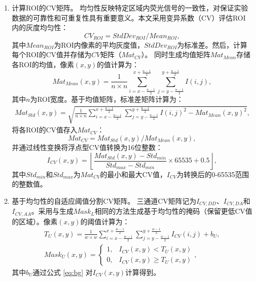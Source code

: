 \begin{enumerate}
\item {计算ROI的CV矩阵。}  
均匀性反映特定区域内荧光信号的一致性，对保证实验数据的可靠性和可重复性具有重要意义。本文采用变异系数（CV）评估ROI内的灰度均匀性：
\begin{equation}
   {CV}_{ROI}={StdDev}_{ROI} / {Mean}_{ROI},
    \label{eq4}
\end{equation}
其中${Mean}_{ROI}$为ROI内像素的平均灰度值，${StdDev}_{ROI}$为标准差。然后，计算每个ROI的CV值并存储为$CV$矩阵（${Mat}_{CV}$）。  
同时生成均值矩阵${Mat}_{Mean}$存储各ROI的均值，像素$(x,y)$的值计算为：
\begin{equation}    
    {Mat}_{Mean}(x,y)=\frac{1}{n \times n} \sum_{i=x- \frac{n-1}{2}}^{x+\frac{n-1}{2}} \sum_{j=y-\frac{n-1}{2}}^{y+\frac{n-1}{2}} I(i,j),
    \label{eq5}
\end{equation}
其中$n$为ROI宽度。基于均值矩阵，标准差矩阵计算为：
\begin{equation}
    \begin{split}
    {Mat}_{Std}(x,y)=
    \sqrt{\frac{1}{n \times n} \sum_{i=x-\frac{n-1}{2}}^{x+\frac{n-1}{2}} \sum_{j=y-\frac{n-1}{2}}^{y+\frac{n-1}{2}}{I(i,j)}^2-{{Mat}_{Mean}(x,y)}^2},
    \end{split}
    \label{eq6}
\end{equation}
将各ROI的CV值存入${Mat}_{CV}$：
\begin{equation}
    {Mat}_{CV}={Mat}_{Std}(x,y)/{Mat}_{Mean}(x,y),
    \label{eq7}
\end{equation}
并通过线性变换将浮点型CV值转换为16位整数：
\begin{equation}
    {I}_{CV}(x,y)=\left\lfloor\frac{{Mat}_{Std}(x,y)-{Std}_{min}} {{Std}_{max}-{Std}_{min}}\times65535 + 0.5\right\rfloor,
\end{equation}
其中${Std}_{min}$和${Std}_{max}$为${Mat}_{CV}$的最小和最大CV值，$I_{CV}$为转换后的0-65535范围的整数值。

\item {基于均匀性的自适应阈值分割CV矩阵。}  
三通道CV矩阵记为$I_{CV, DD}$、$I_{CV, DA}$和$I_{CV,AA}$。采用与生成${Mask}_{L}$相同的方法生成基于均匀性的掩码（保留更低CV值的区域）。像素$(x,y)$的阈值计算为：
\begin{align}
    T_U(x, y)=\frac{1}{w \times w} \sum_{i=x-\frac{w-1}{2}}^{x+\frac{w-1}{2}} \sum_{j=y-\frac{w-1}{2}}^{y+\frac{w-1}{2}} {I}_{CV}(i, j)+b_U,
    \label{eq8} \\
    {Mask}_U(x,y)=\begin{cases}1,&I_{CV}(x,y) < T_U(x, y)\\ 0,&I_{CV}(x, y) \ge T_U(x, y)\end{cases},
    \label{eq9}
\end{align}
其中$b_U$通过公式 \ref{eq:bg} 对$I_{CV}(x,y)$计算得到。


\end{enumerate}
